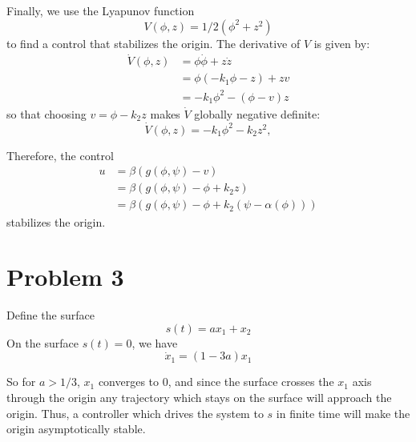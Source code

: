 \documentclass{homework}
\begin{document}
Finally, we use the Lyapunov function
\begin{equation*}
    V(\phi, z) = 1/2 (\phi^2 + z^2)
\end{equation*}
to find a control that stabilizes the origin. The 
derivative of $V$ is given by:
\begin{align*}
    \dot{V}(\phi, z) &= \phi \dot{\phi} + z \dot{z} \\
        &= \phi( - k_1 \phi - z) + zv \\ 
        &= -k_1 \phi^2 - (\phi - v) z
\end{align*}
so that choosing $v = \phi -k_2 z$ makes $\dot{V}$ globally
negative definite:
\begin{equation*}
    \dot{V}(\phi, z) = - k_1 \phi^2 - k_2 z^2,
\end{equation*}

Therefore, the control
\begin{align*}
    u &= \beta ( g(\phi, \psi) - v) \\
        &= \beta ( g(\phi, \psi) - \phi + k_2 z) \\
        &= \beta ( g(\phi, \psi) - \phi + k_2 (\psi - \alpha(\phi)))
\end{align*}
stabilizes the origin.

\section{Problem 3}
Define the surface
\begin{equation*}
    s(t) = ax_1 + x_2
\end{equation*}
On the surface $s(t) = 0$, we have
\begin{equation*}
    \dot{x}_1 = (1 - 3a) x_1
\end{equation*}

So for $a > 1/3$, $x_1$ converges to 0, and since the surface
crosses the $x_1$ axis through the origin any trajectory which stays on
the surface will approach the origin. Thus, a controller
which drives the system to $s$ in finite time will make the origin
asymptotically stable.

\end{document}
